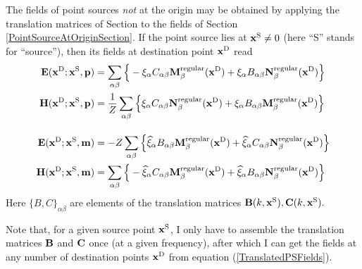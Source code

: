 \documentclass[letterpaper]{article}
\begin{document}
The fields of point sources \textit{not} at the
origin may be obtained by applying the translation matrices
of Section \label{TranslationMatrixSection}
to the fields of Section \ref{PointSourceAtOriginSection}.
If the point source lies at $\mathbf{x}^{\text{\scriptsize S}}\ne 0$ (here ``S''
stands for ``source''), then 
its fields at destination point $\mathbf{x}^{\text{\scriptsize D}}$
read
\begin{subequations}
\begin{align}
 \mathbf{E}(\mathbf{x}^{\text{\scriptsize D}}; \mathbf{x}^{\text{\scriptsize S}}, \mathbf{p})
   &= \sum_{\alpha\beta}
      \Big\{
       -\xi_\alpha C_{\alpha\beta}  \mathbf{M}_\beta^{\text{\scriptsize regular}}(\mathbf{x}^{\text{\scriptsize D}})
       +\xi_\alpha B_{\alpha\beta} \mathbf{N}_\beta^{\text{\scriptsize regular}}(\mathbf{x}^{\text{\scriptsize D}})
      \Big\}
\\
 \mathbf{H}(\mathbf{x}^{\text{\scriptsize D}}; \mathbf{x}^{\text{\scriptsize S}}, \mathbf{p})
   &= \frac{1}{Z}\sum_{\alpha\beta}
                    \Big\{
         \xi_\alpha C_{\alpha\beta} \mathbf{N}_\beta^{\text{\scriptsize regular}}(\mathbf{x}^{\text{\scriptsize D}})
       + \xi_\alpha B_{\alpha\beta} \mathbf{M}_\beta^{\text{\scriptsize regular}}(\mathbf{x}^{\text{\scriptsize D}})
                    \Big\}
\\[10pt]
 \mathbf{E}(\mathbf{x}^{\text{\scriptsize D}}; \mathbf{x}^{\text{\scriptsize S}}, \mathbf{m})
   &=-Z \sum_{\alpha\beta} \Big\{
        \widehat{\xi}_\alpha B_{\alpha\beta} \mathbf{M}_\beta^{\text{\scriptsize regular}}(\mathbf{x}^{\text{\scriptsize D}})
       +\widehat{\xi}_\alpha C_{\alpha\beta} \mathbf{N}_\beta^{\text{\scriptsize regular}}(\mathbf{x}^{\text{\scriptsize D}})
                    \Big\}
\\
 \mathbf{H}(\mathbf{x}^{\text{\scriptsize D}}; \mathbf{x}^{\text{\scriptsize S}}, \mathbf{m})
   &= \sum_{\alpha\beta} \Big\{
       -\widehat{\xi}_\alpha C_{\alpha\beta} \mathbf{M}_\beta^{\text{\scriptsize regular}}(\mathbf{x}^{\text{\scriptsize D}})
       +\widehat{\xi}_\alpha B_{\alpha\beta} \mathbf{N}_\beta^{\text{\scriptsize regular}}(\mathbf{x}^{\text{\scriptsize D}})
                    \Big\}
\end{align}
\label{TranslatedPSFields}
\end{subequations}
Here $\{B,C\}_{\alpha\beta}$ are elements of the translation matrices
$\mathbf{B}(k,\mathbf{x}^{\text{\scriptsize S}}), \mathbf{C}(k,\mathbf{x}^{\text{\scriptsize S}}).$

Note that, for a given source point $\mathbf{x}^{\text{\scriptsize S}}$, I only have
to assemble the translation matrices $\mathbf{B}$ and $\mathbf{C}$ once
(at a given frequency), after which I can get the fields
at any number of destination points $\mathbf{x}^{\text{\scriptsize D}}$ from
equation (\ref{TranslatedPSFields}).


\newpage
\end{document}
